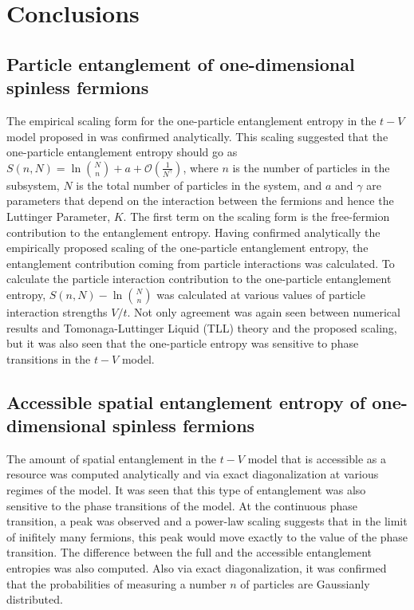 \section{Conclusions}

\subsection{Particle entanglement of one-dimensional spinless fermions}

The empirical scaling form for the one-particle entanglement entropy in the $t-V$ model proposed in \cite{PhysRevA.78.042326} was confirmed analytically. This scaling suggested that the one-particle entanglement entropy should go as $S(n,N) = \ln{{N}\choose{n}} + a + \mathcal{O}(\frac{1}{N^{\gamma}})$, where $n$ is the number of particles in the subsystem, $N$ is the total number of particles in the system, and $a$ and $\gamma$ are parameters that depend on the interaction between the fermions and hence the Luttinger Parameter, $K$.  The first term on the scaling form is the free-fermion contribution to the entanglement entropy. Having confirmed analytically the empirically proposed scaling of the one-particle entanglement entropy, the entanglement contribution coming from particle interactions was calculated. To calculate the particle interaction contribution to the one-particle entanglement entropy,  $S(n,N) - \ln{{N}\choose{n}}$ was calculated at various values of particle interaction strengths $V/t$. Not only agreement was again seen between numerical results and Tomonaga-Luttinger Liquid (TLL) theory and the proposed scaling, but it was also seen that the one-particle entropy was sensitive to phase transitions in the $t-V$ model.

\subsection{Accessible spatial entanglement entropy of one-dimensional spinless fermions}

The amount of spatial entanglement in the $t-V$ model that is accessible as a resource was computed analytically and via exact diagonalization at various regimes of the model. It was seen that this type of entanglement was also sensitive to the phase transitions of the model. At the continuous phase transition, a peak was observed and a power-law scaling suggests that in the limit of inifitely many fermions, this peak would move exactly to the value of the phase transition. The difference between the full and the accessible entanglement entropies was also computed. Also via exact diagonalization, it was confirmed that the probabilities of measuring a number $n$ of particles are Gaussianly distributed.
 
